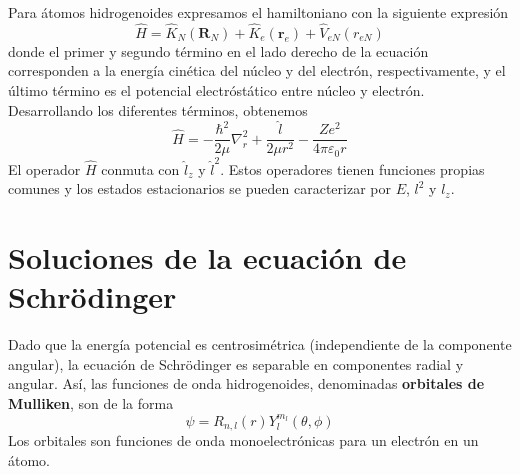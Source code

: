 Para átomos hidrogenoides expresamos el hamiltoniano con la siguiente
expresión
\begin{equation}
    \hat{H}=\hat{K}_N(\mathbf{R}_N) + \hat{K}_e(\mathbf{r}_e) + \hat{V}_{eN}(r_{eN})
\end{equation}
donde el primer y segundo término en el lado derecho de la ecuación 
corresponden a la energía cinética del núcleo y del electrón, 
respectivamente, y el último término es el potencial electróstático 
entre núcleo y electrón. Desarrollando los diferentes términos,
obtenemos
\begin{equation}
    \hat{H}=-\frac{\hbar^2}{2\mu}\nabla_r^2+ \frac{\hat{l}}{2\mu r^2} - \frac{Ze^2}{4\pi \varepsilon_0r}
\end{equation}
El operador $\hat{H}$ conmuta con $\hat{l}_z$ y $\hat{l}^2$. Estos
operadores tienen funciones propias comunes y los estados estacionarios
se pueden caracterizar por $E$, $l^2$ y $l_z$. 

\section{Soluciones de la ecuación de Schrödinger}
Dado que la energía potencial es centrosimétrica (independiente
de la componente angular), la ecuación de Schrödinger es separable
en componentes radial y angular. Así, las funciones de onda
hidrogenoides, denominadas \textbf{orbitales de Mulliken}, son de la forma
\begin{equation}
    \psi=R_{n,l}(r)Y^{m_l}_l(\theta,\phi)
\end{equation}
Los orbitales son funciones de onda monoelectrónicas para un
electrón en un átomo.


